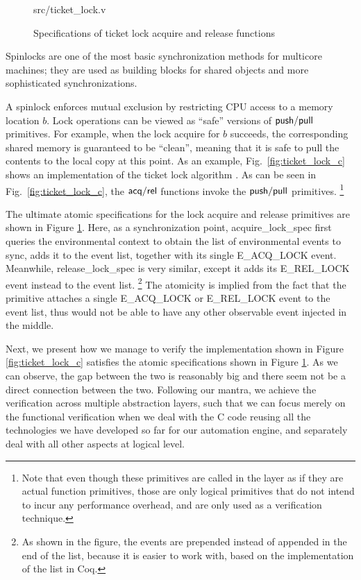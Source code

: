 \begin{figure}
	 {src/ticket_lock.v}
	\caption{Specifications of ticket lock acquire and release functions}
	\label{fig:ticket_lock_v}
\end{figure}

Spinlocks are one of the most basic synchronization
methods for multicore machines; they are used as building
blocks for shared objects and more sophisticated synchronizations.


A spinlock enforces mutual exclusion by restricting CPU access to
a memory location $b$. Lock operations can be viewed
as ``safe'' versions of $\mathsf{push}/\mathsf{pull}$ primitives.
For example, when the lock acquire  for $b$ succeeds,
the corresponding shared memory is guaranteed
to be ``clean'', meaning that it is safe to 
pull the contents to the local copy at this point.
As an example, Fig.~\ref{fig:ticket_lock_c} shows
an implementation of the ticket lock algorithm \cite{mcs91}.
As can be seen in Fig.~\ref{fig:ticket_lock_c},
the $\mathsf{acq}/\mathsf{rel}$ functions invoke the $\mathsf{push}/\mathsf{pull}$ primitives.
\footnote{Note that even though these primitives are
called in the layer as if they are actual function primitives,
those are only logical primitives that do not intend to incur
any performance overhead, and are only used as a verification
technique.}

The ultimate atomic specifications for the lock acquire and release primitives
are shown in Figure \ref{fig:ticket_lock_v}. 
Here, as a synchronization point, \textsf{acquire\_lock\_spec} first queries the
environmental context to obtain the list of environmental events to sync, adds
it to the event list, together with its single \textsf{E\_ACQ\_LOCK} event.
Meanwhile, \textsf{release\_lock\_spec} is very similar, except it adds its
 \textsf{E\_REL\_LOCK} event instead to the event list. \footnote{As shown in the figure,
 the events are prepended instead of appended in the end of the list, because it is easier
 to work with, based on the implementation of the list in Coq.}
The atomicity is implied from the fact
that the primitive attaches a single \textsf{E\_ACQ\_LOCK} or \textsf{E\_REL\_LOCK}
event to the event list, thus would not be able to have any other observable event
injected in the middle. 

Next, we present how we manage to verify the implementation shown in Figure
\ref{fig:ticket_lock_c} satisfies the atomic specifications shown in Figure
\ref{fig:ticket_lock_v}. As we can observe, the gap between the two is reasonably
big and there seem not be a direct connection between the two.
Following our mantra, we achieve the verification across multiple abstraction layers,
such that we can focus merely on the functional verification when we deal with the
C code reusing all the technologies we have developed so far for our automation engine,
and separately deal with all other aspects at logical level.

